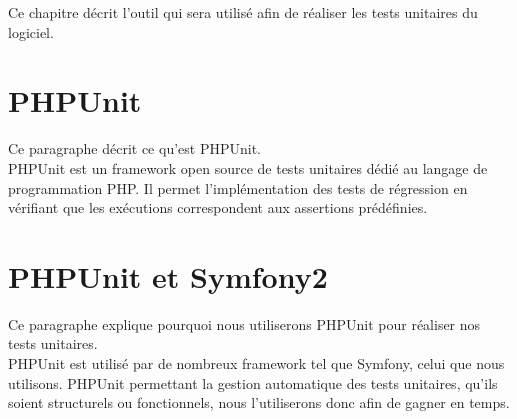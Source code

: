 
	Ce chapitre décrit l'outil qui sera utilisé afin de réaliser les tests unitaires du logiciel.
	
\section{PHPUnit}
	Ce paragraphe décrit ce qu'est PHPUnit. \\
	
	PHPUnit est un framework open source de tests unitaires dédié au langage de programmation PHP. Il permet l'implémentation des tests de régression en vérifiant que les exécutions correspondent aux assertions prédéfinies.
	
\section{PHPUnit et Symfony2}
	Ce paragraphe explique pourquoi nous utiliserons PHPUnit pour réaliser nos tests unitaires. \\
	
	PHPUnit est utilisé par de nombreux framework tel que Symfony, celui que nous utilisons. PHPUnit permettant la gestion automatique des tests unitaires, qu'ils soient structurels ou fonctionnels, nous l'utiliserons donc afin de gagner en temps.
	
